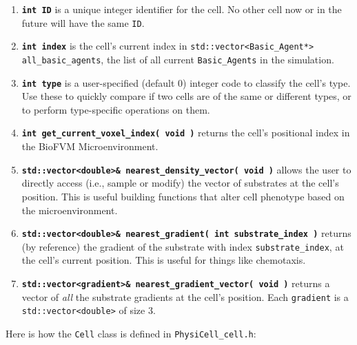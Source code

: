 \documentclass[12pt]{article}
\renewcommand{\v}{\verb}
\newcommand{\smallcode}[1]{\textbf{\texttt{#1}}}
\begin{document}
\begin{enumerate}
\item 
\smallcode{int ID} is a unique integer identifier for the cell. No other 
cell now or in the future will have the same \v|ID|.

\item 
\smallcode{int index} is the cell's current index in 
\v|std::vector<Basic_Agent*> all_basic_agents|, the list of all 
current \v|Basic_Agents| in the simulation. 

\item 
\smallcode{int type} is a user-specified (default 0) integer code 
to classify the cell's type. Use these to quickly compare if two 
cells are of the same or different types, or to perform 
type-specific operations on them. 

\item 
\smallcode{int get\_current\_voxel\_index( void )} returns the 
cell's positional index in the BioFVM Microenvironment. 

\item 
\smallcode{std::vector<double>\& nearest\_density\_vector( void )} allows 
the user to directly access (i.e., sample or modify) the vector 
of substrates at the cell's position. This is useful building 
functions that alter cell phenotype based on the microenvironment. 

\item 
\smallcode{std::vector<double>\& nearest\_gradient( int substrate\_index )} 
returns (by reference) the gradient of the substrate with index 
\v|substrate_index|, at the cell's current position. 
This is useful for things like chemotaxis. 

\item 
\smallcode{std::vector<gradient>\& nearest\_gradient\_vector( void )} 
returns a vector of \emph{all} the substrate gradients at the 
cell's position. Each \v|gradient| is a 
\v|std::vector<double>| of size 3. 
\end{enumerate}
 
Here is how the \v|Cell| class is defined in 
\v|PhysiCell_cell.h|: 
\end{document}
